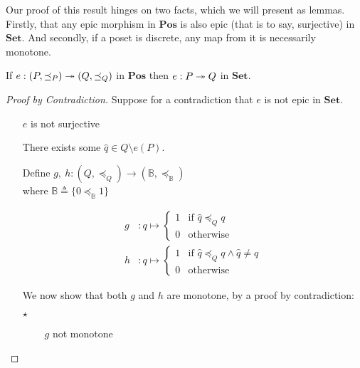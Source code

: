 Our proof of this result hinges on two facts, which we will present as lemmas. Firstly, that any epic morphism in $\mathbf{Pos}$ is also epic (that is to say, surjective) in $\mathbf{Set}$. And secondly, if a poset is discrete, any map from it is necessarily monotone.

\begin{lemma}\label{lemma:epic-poset-set}
  If $e : (P, \preceq_P) \twoheadrightarrow (Q, \preceq_Q)$ in $\mathbf{Pos}$ then $e : P \twoheadrightarrow Q$ in $\mathbf{Set}$.

  \begin{proof}[Proof by Contradiction]
    Suppose for a contradiction that $e$ is not epic in $\mathbf{Set}$.

    \begin{itemize}
      \item[\iffs] $e$ is not surjective

      \item[\imps] There exists some $\hat{q}\in Q\setminus e(P)$.

      \addtolength{\itemsep}{.5\baselineskip}
      \item[\phs]
        Define $g,~h : (Q, \preceq_Q) \to (\mathbb{B}, \preceq_{\mathbb{B}})$\\
        where $\mathbb{B}\triangleq\{0 \preceq_{\mathbb{B}} 1\}$

        \begin{align*}
          g & : q \mapsto
          \begin{cases}
            1 & \text{if }\hat{q}\preceq_Q q\\
            0 & \text{otherwise}
          \end{cases}\\
          h & : q \mapsto
          \begin{cases}
            1 & \text{if }\hat{q}\preceq_Q q\wedge\hat{q}\neq q\\
            0 & \text{otherwise}
          \end{cases}
        \end{align*}

        We now show that both $g$ and $h$ are monotone, by a proof by contradiction:

      \addtolength{\itemsep}{-.5\baselineskip}
      \item[$\star$]
        \begin{itemize}
          \item[\phs]\Ass~$g$ not monotone
            \marginnote{\Hyp}


\end{itemize}
\end{itemize}
\end{proof}
\end{lemma}
